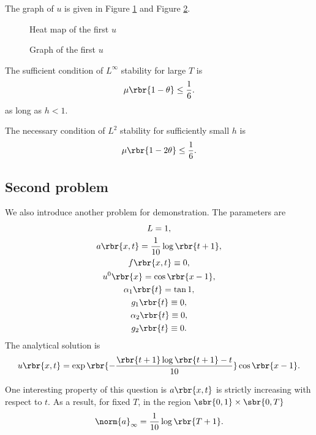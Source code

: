 \documentclass[english, nochinese]{pnote}
\begin{document}
The graph of $u$ is given in Figure \ref{Fig:Eq1Heat} and Figure \ref{Fig:Eq1Curve}.

\begin{figure}[htbp]
\centering

\caption{Heat map of the first $u$}
\label{Fig:Eq1Heat}
\end{figure}

\begin{figure}[htbp]
\centering

\caption{Graph of the first $u$}
\label{Fig:Eq1Curve}
\end{figure}

The sufficient condition of $L^{\infty}$ stability for large $T$ is
\begin{equation}
\mu \rbr{ 1 - \theta } \le \frac{1}{6}.
\end{equation}
as long as $ h < 1 $.

The necessary condition of $L^2$ stability for sufficiently small $h$ is
\begin{equation}
\mu \rbr{ 1 - 2 \theta } \le \frac{1}{6}.
\end{equation}

\subsection{Second problem}

We also introduce another problem for demonstration. The parameters are
\begin{gather}
L = 1, \\
a \rbr{ x, t } = \frac{1}{10} \log \rbr{ t + 1 }, \\
f \rbr{ x, t } \equiv 0, \\
u^0 \rbr{x} = \cos \rbr{ x - 1 }, \\
\alpha_1 \rbr{t} = \tan 1, \\
g_1 \rbr{t} \equiv 0, \\
\alpha_2 \rbr{t} \equiv 0, \\
g_2 \rbr{t} \equiv 0.
\end{gather}
The analytical solution is
\begin{equation}
u \rbr{ x, t } = \exp \rbr{-\frac{ \rbr{ t + 1 } \log \rbr{ t + 1 } - t }{10}} \cos \rbr{ x - 1 }.
\end{equation}

One interesting property of this question is $ a \rbr{ x, t } $ is strictly increasing with respect to $t$. As a result, for fixed $T$, in the region $ \sbr{ 0, 1 } \times \sbr{ 0, T } $
\begin{equation}
\norm{a}_{\infty} = \frac{1}{10} \log \rbr{ T + 1 }.
\end{equation}
\end{document}
